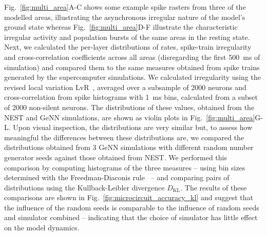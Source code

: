 \documentclass[9pt,a4paper]{amsart}
\begin{document}
Fig.~\ref{fig:multi_area}A-C shows some example spike rasters from three of the modelled areas, illustrating the asynchronous irregular nature of the model's ground state whereas Fig.~\ref{fig:multi_area}D-F illustrate the characteristic irregular activity and population bursts of the same areas in the resting state.
Next, we calculated the per-layer distributions of rates, spike-train irregularity and cross-correlation coefficients across all areas (disregarding the first \SI{500}{\milli\second} of simulation) and compared them to the same measures obtained from spike trains generated by the supercomputer simulations.
We calculated irregularity using the revised local variation LvR~\citep{Shinomoto2009}, averaged over a subsample of \num{2000} neurons and cross-correlation from spike histograms with \SI{1}{\milli\second} bins, calculated from a subset of \num{2000} non-silent neurons.
The distributions of these values, obtained from the NEST and GeNN simulations, are shown as violin plots in Fig.~\ref{fig:multi_area}G-L.
Upon visual inspection, the distributions are very similar but, to assess how meaningful the differences between these distributions are, we compared the distributions obtained from 3 GeNN simulations with different random number generator seeds against those obtained from NEST.
We performed this comparison by computing histograms of the three measures -- using bin sizes determined with the Freedman-Diaconis rule~\citep{Freedman1981} -- and comparing pairs of distributions using the Kullback-Leibler divergence $D_\text{KL}$.
The results of these comparisons are shown in Fig.~\ref{fig:microcircuit_accuracy_kl} and suggest that the influence of the random seeds is comparable to the influence of random seeds and simulator combined -- indicating that the choice of simulator has little effect on the model dynamics.
%
\end{document}
